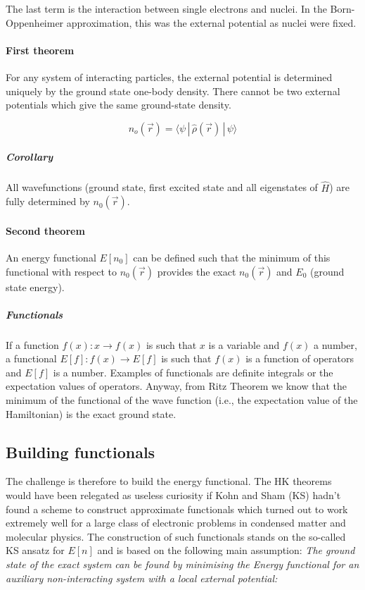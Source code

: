 		The last term is the interaction between single electrons and nuclei.
		In the Born-Oppenheimer approximation, this was the external potential as nuclei were fixed.

			\paragraph{First theorem}
			For any system of interacting particles, the external potential is determined uniquely by the ground state one-body density.
			There cannot be two  external potentials which give the same ground-state density.

			$$n_o(\vec{r})=\langle \psi\,|\,\hat{\rho}(\vec{r})\,|\,\psi \rangle$$

				\subparagraph{Corollary}
				All wavefunctions (ground state, first excited state and all eigenstates of $\hat{H}$) are fully determined by $n_0(\vec{r})$.

			\paragraph{Second theorem}
			An energy functional $E[n_0]$ can be defined such that the minimum of this functional with respect to $n_0(\vec{r})$ provides the exact $n_0(\vec{r})$ and $E_0$ (ground state energy).

				\subparagraph{Functionals}
				If a function $f(x):x\rightarrow f(x)$ is such that $x$ is a variable and $f(x)$ a number, a functional $E[f]:f(x)\rightarrow E[f]$ is such that $f(x)$ is a function of operators and $E[f]$ is a number.
				Examples of functionals are definite integrals or the expectation values of operators.
				Anyway, from Ritz Theorem we know that the minimum of the functional of the wave function (i.e., the expectation value of the Hamiltonian) is the exact ground state.

\subsection{Building functionals}
The challenge is therefore to build the energy functional.
The HK theorems would have been relegated as useless curiosity if Kohn and Sham (KS) hadn't found a scheme to construct approximate functionals which turned out to work extremely well for a large class of electronic problems in condensed matter and molecular physics.
The construction of such functionals stands on the so-called KS ansatz for $E[n]$ and is based on the following main assumption: \textit{The ground state of the exact system can be found by minimising the Energy functional for an auxiliary non-interacting system with a local external potential:}

